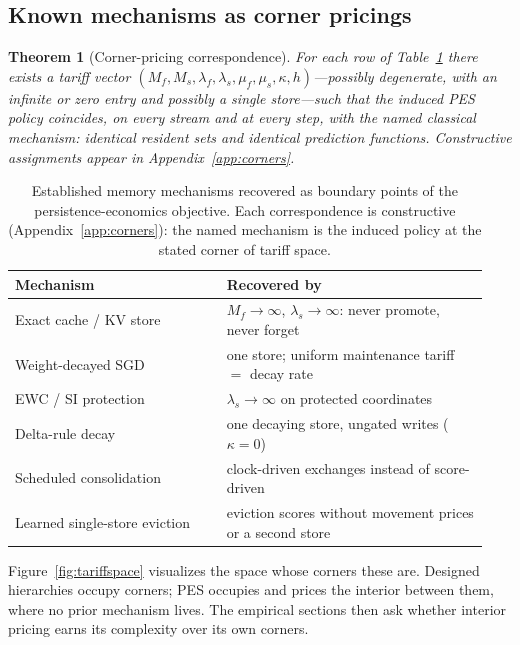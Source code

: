 \documentclass[10pt,twocolumn]{article}
\newtheorem{theorem}{Theorem}
\theoremstyle{definition}
\newcommand{\PES}{PES}
\begin{document}
\subsection{Known mechanisms as corner pricings}\label{sec:corners}

\begin{theorem}[Corner-pricing correspondence]\label{thm:corners}
For each row of Table~\ref{tab:corners} there exists a tariff vector
$(M_f,M_s,\lambda_f,\lambda_s,\mu_f,\mu_s,\kappa,h)$---possibly degenerate, with an infinite or zero entry
and possibly a single store---such that the induced \PES{} policy coincides, on every stream and at every
step, with the named classical mechanism: identical resident sets and identical prediction functions.
Constructive assignments appear in Appendix~\ref{app:corners}.
\end{theorem}

\begin{table}[t]
\centering\small
\caption{Established memory mechanisms recovered as boundary points of the persistence-economics objective.
Each correspondence is constructive (Appendix~\ref{app:corners}): the named mechanism is the induced policy
at the stated corner of tariff space.}
\label{tab:corners}
\begin{tabular}{@{}>{\raggedright\arraybackslash}p{0.42\linewidth}>{\raggedright\arraybackslash}p{0.52\linewidth}@{}}
\toprule
Mechanism & Recovered by \\
\midrule
Exact cache / {KV} store & $M_f\!\to\!\infty$, $\lambda_s\!\to\!\infty$: never promote, never forget \\
Weight-decayed {SGD} & one store; uniform maintenance tariff $=$ decay rate \\
EWC / SI protection & $\lambda_s\to\infty$ on protected coordinates \\
Delta-rule decay & one decaying store, ungated writes ($\kappa{=}0$) \\
Scheduled consolidation & clock-driven exchanges instead of score-driven \\
Learned single-store eviction & eviction scores without movement prices or a second store \\
\bottomrule
\end{tabular}
\end{table}

Figure~\ref{fig:tariffspace} visualizes the space whose corners these are. Designed hierarchies occupy
corners; \PES{} occupies and prices the interior between them, where no prior mechanism lives. The empirical
sections then ask whether interior pricing earns its complexity over its own corners.
\end{document}
